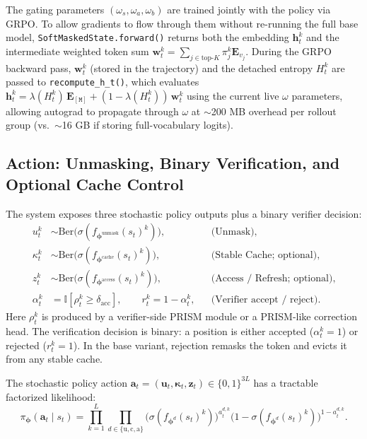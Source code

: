 \documentclass[11pt]{article}
\newcommand{\bphi}{\bm{\phi}}
\newcommand{\bu}{\mathbf{u}}
\newcommand{\bh}{\mathbf{h}}
\newcommand{\ind}{\mathbb{I}}
\newcommand{\mask}{\ensuremath{\mathtt{[M]}}}
\begin{document}
The gating parameters $(\omega_s, \omega_a, \omega_b)$ are trained jointly with the policy via GRPO.
To allow gradients to flow through them without re-running the full base model, \texttt{SoftMaskedState.forward()} returns both the embedding $\bh_t^k$ and the intermediate weighted token sum $\mathbf{w}_t^k = \sum_{j \in \text{top-}K} \pi_j^k \mathbf{E}_{v_j}$.
During the GRPO backward pass, $\mathbf{w}_t^k$ (stored in the trajectory) and the detached entropy $H_t^k$ are passed to \texttt{recompute\_h\_t()}, which evaluates $\bh_t^k = \lambda(H_t^k)\,\mathbf{E}_{\mask} + (1-\lambda(H_t^k))\,\mathbf{w}_t^k$ using the current live $\omega$ parameters, allowing autograd to propagate through $\omega$ at ${\sim}$200 MB overhead per rollout group (vs.\ ${\sim}$16 GB if storing full-vocabulary logits).

\subsection{Action: Unmasking, Binary Verification, and Optional Cache Control}
\label{sec:action}

The system exposes three stochastic policy outputs plus a binary verifier decision:
\begin{align}
    u_t^k &\sim \text{Ber}\bigl(\sigma(f_{\bphi^{\text{unmask}}}(s_t)^k)\bigr), & &\text{(Unmask)}, \label{eq:action_u} \\
    \kappa_t^k &\sim \text{Ber}\bigl(\sigma(f_{\bphi^{\text{cache}}}(s_t)^k)\bigr), & &\text{(Stable Cache; optional)}, \label{eq:action_c} \\
    z_t^k &\sim \text{Ber}\bigl(\sigma(f_{\bphi^{\text{access}}}(s_t)^k)\bigr), & &\text{(Access / Refresh; optional)}, \label{eq:action_z} \\
    \alpha_t^k &= \ind[\rho_t^k \ge \delta_{\text{acc}}], \qquad
    r_t^k = 1 - \alpha_t^k, & &\text{(Verifier accept / reject)}. \label{eq:action_r}
\end{align}
Here $\rho_t^k$ is produced by a verifier-side PRISM module or a PRISM-like correction head. The verification decision is binary: a position is either accepted ($\alpha_t^k = 1$) or rejected ($r_t^k = 1$). In the base variant, rejection remasks the token and evicts it from any stable cache.

The stochastic policy action $\mathbf{a}_t = (\bu_t, \bm{\kappa}_t, \mathbf{z}_t) \in \{0,1\}^{3L}$ has a tractable factorized likelihood:
\begin{equation}
    \pi_{\bphi}(\mathbf{a}_t \mid s_t) = \prod_{k=1}^L \prod_{d \in \{\text{u}, \text{c}, \text{a}\}} \bigl(\sigma(f_{\bphi^d}(s_t)^k)\bigr)^{a_t^{d,k}} \bigl(1 - \sigma(f_{\bphi^d}(s_t)^k)\bigr)^{1 - a_t^{d,k}}.
    \label{eq:policy_likelihood}
\end{equation}
\end{document}
